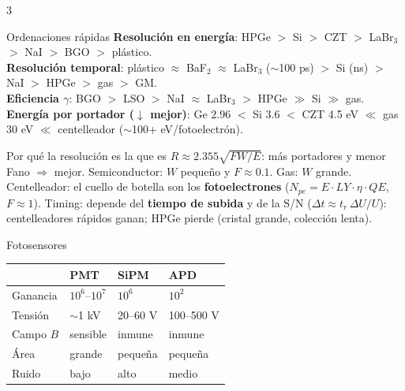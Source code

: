 \documentclass[10pt,a4paper,landscape]{article}
\newcommand{\best}{\cellcolor{ForestGreen!18}}
\newcommand{\bad}{\cellcolor{red!12}}
\begin{document}
\vspace{2pt}
\begin{multicols}{3}
\begin{caja}{Ordenaciones rápidas}
\small
\textbf{Resolución en energía}: HPGe $>$ Si $>$ CZT $>$ LaBr$_3$ $>$ NaI $>$ BGO $>$ plástico.\\[1pt]
\textbf{Resolución temporal}: plástico $\approx$ BaF$_2$ $\approx$ LaBr$_3$ ($\sim$100 ps) $>$ Si (ns) $>$ NaI $>$ HPGe $>$ gas $>$ GM.\\[1pt]
\textbf{Eficiencia $\gamma$}: BGO $>$ LSO $>$ NaI $\approx$ LaBr$_3$ $>$ HPGe $\gg$ Si $\gg$ gas.\\[1pt]
\textbf{Energía por portador ($\downarrow$ mejor)}: Ge 2.96 $<$ Si 3.6 $<$ CZT 4.5 eV $\ll$ gas 30 eV $\ll$ centelleador ($\sim$100+ eV/fotoelectrón).
\end{caja}
\columnbreak
\begin{caja}{Por qué la resolución es la que es}
\small
$R\approx2.355\sqrt{FW/E}$: más portadores y menor Fano $\Rightarrow$ mejor.
Semiconductor: $W$ pequeño y $F\approx0.1$. Gas: $W$ grande. Centelleador: el cuello de botella son los \textbf{fotoelectrones} ($N_{pe}=E\cdot LY\cdot\eta\cdot QE$, $F\approx1$).
Timing: depende del \textbf{tiempo de subida} y de la S/N ($\Delta t\approx t_r\,\Delta U/U$): centelleadores rápidos ganan; HPGe pierde (cristal grande, colección lenta).
\end{caja}
\columnbreak
\begin{caja}{Fotosensores}
\small
\begin{tabular}{@{}llll@{}}
& PMT & SiPM & APD\\\midrule
Ganancia & $10^6$--$10^7$ & $10^6$ & $10^2$\\
Tensión & \bad $\sim$1 kV & \best 20--60 V & 100--500 V\\
Campo $B$ & \bad sensible & \best inmune & inmune\\
Área & \best grande & pequeña & pequeña\\
Ruido & \best bajo & \bad alto & medio\\
\end{tabular}
\end{caja}
\end{multicols}
\end{document}
